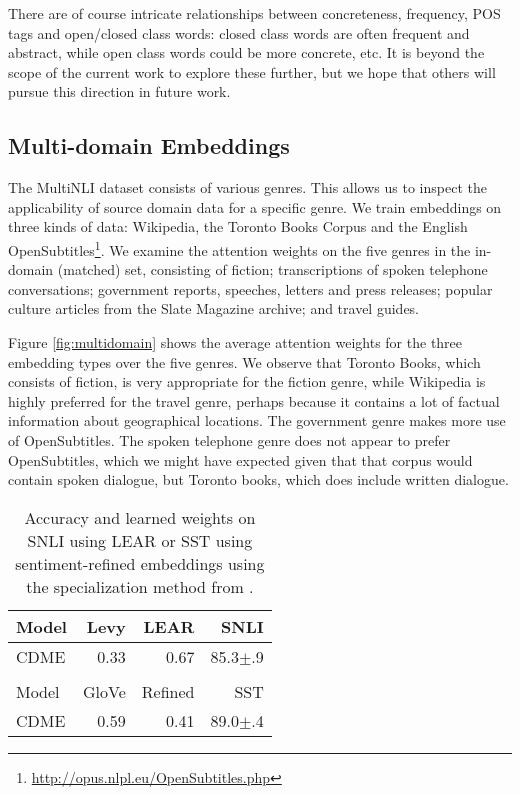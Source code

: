 \documentclass[11pt,a4paper]{article}
\begin{document}
There are of course intricate relationships between concreteness, frequency, POS tags and open/closed class words: closed class words are often frequent and abstract, while open class words could be more concrete, etc. It is beyond the scope of the current work to explore these further, but we hope that others will pursue this direction in future work.

\subsection{Multi-domain Embeddings}

The MultiNLI dataset consists of various genres. This allows us to inspect the applicability of source domain data for a specific genre. We train embeddings on three kinds of data: Wikipedia, the Toronto Books Corpus \cite{Zhu:2015iccv} and the English OpenSubtitles\footnote{\url{http://opus.nlpl.eu/OpenSubtitles.php}}. We examine the attention weights on the five genres in the in-domain (matched) set, consisting of fiction; transcriptions of spoken telephone conversations; government reports, speeches, letters and press releases; popular culture articles from the Slate Magazine archive; and travel guides.

Figure \ref{fig:multidomain} shows the average attention weights for the three embedding types over the five genres. We observe that Toronto Books, which consists of fiction, is very appropriate for the fiction genre, while Wikipedia is highly preferred for the travel genre, perhaps because it contains a lot of factual information about geographical locations. The government genre makes more use of OpenSubtitles. The spoken telephone genre does not appear to prefer OpenSubtitles, which we might have expected given that that corpus would contain spoken dialogue, but Toronto books, which does include written dialogue.

\begin{table}[t]
  \centering
  \begin{tabular}{lrr|r}
    \toprule
    Model & Levy & LEAR & SNLI\\
    \midrule
    CDME & 0.33 & 0.67 & 85.3$\pm$.9\\
	& & & \\
    \toprule
    Model & GloVe & Refined & SST\\
    \midrule
    CDME & 0.59 & 0.41 & 89.0$\pm$.4\\
    \bottomrule
  \end{tabular}
  \caption{\label{table:specialization} Accuracy and learned weights on SNLI using LEAR \cite{Vulic:2017arxiv} or SST using sentiment-refined embeddings using the specialization method from .}
\end{table}
\end{document}
